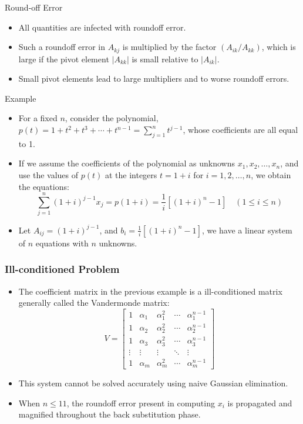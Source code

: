 \documentclass{beamer}
\begin{document}
\begin{frame}{Round-off Error}
\begin{itemize}
\item All quantities are infected with \alert{roundoff error}.
\item Such a roundoff error in $A_{kj}$ is multiplied by the factor $(A_{ik}/A_{kk})$, which is large if the pivot element $|A_{kk}|$ is small relative to $|A_{ik}|$.
 \item Small pivot elements lead to large multipliers and to \alert{worse roundoff errors}.
 \end{itemize}
\end{frame}
\begin{frame}{Example}
\begin{itemize}
\item For a fixed $n$, consider the polynomial, $p(t)=1+t^2+t^3+\cdots+t^{n-1}=\sum_{j=1}^n t^{j-1}$,
 whose coefficients are all equal to 1.
\item If we assume the coefficients of the polynomial as unknowns $x_1, x_2,\ldots, x_n$, and use the values of $p(t)$ at the integers $t = 1+i$ for $i =1,2,\ldots,n$, we obtain the equations: 
\[
\sum_{j=1}^n (1+i)^{j-1}x_j=p(1+i)=\frac{1}{i}[(1+i)^n-1] \quad (1\le i\le n)
\]
\item Let $A_{ij}=(1+i)^{j-1}$, and $b_i=\frac{1}{i}[(1+i)^n-1] $, we have a linear system of $n$ equations with $n$ unknowns.
\end{itemize}
\end{frame}
\begin{frame}[fragile]
\frametitle{Ill-conditioned Problem}
\begin{itemize}
\item The coefficient matrix  in the previous example is a  \alert{ill-conditioned matrix} generally called the \alert{Vandermonde matrix}:
\[
V=\left[
\begin{array}{ccccc}
1 & \alpha_1 &\alpha_1^2&\cdots &\alpha_1^{n-1}\\
1 & \alpha_2 &\alpha_2^2&\cdots &\alpha_2^{n-1}\\
1 & \alpha_3 &\alpha_3^2&\cdots &\alpha_3^{n-1}\\
\vdots & \vdots &\vdots&\ddots &\vdots\\
1 & \alpha_m &\alpha_m^2&\cdots &\alpha_m^{n-1}
\end{array}
\right]
\]
\item This system \alert{cannot} be solved accurately using naive Gaussian elimination. 
\item When $n\le11$, the roundoff error present in computing $x_i$ is propagated and magnified throughout the \alert{back substitution phase}. 
\end{itemize}
\end{frame}
\end{document}
